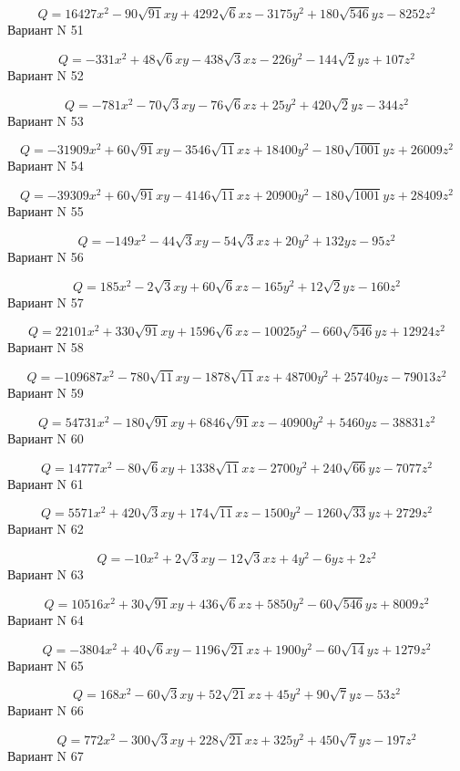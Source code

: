 \documentclass[11pt]{report}
\begin{document}
$$Q = 16427 x^{2} - 90 \sqrt{91} x y + 4292 \sqrt{6} x z - 3175 y^{2} + 180 \sqrt{546} y z - 8252 z^{2}$$Вариант N 51

$$Q = - 331 x^{2} + 48 \sqrt{6} x y - 438 \sqrt{3} x z - 226 y^{2} - 144 \sqrt{2} y z + 107 z^{2}$$Вариант N 52

$$Q = - 781 x^{2} - 70 \sqrt{3} x y - 76 \sqrt{6} x z + 25 y^{2} + 420 \sqrt{2} y z - 344 z^{2}$$Вариант N 53

$$Q = - 31909 x^{2} + 60 \sqrt{91} x y - 3546 \sqrt{11} x z + 18400 y^{2} - 180 \sqrt{1001} y z + 26009 z^{2}$$Вариант N 54

$$Q = - 39309 x^{2} + 60 \sqrt{91} x y - 4146 \sqrt{11} x z + 20900 y^{2} - 180 \sqrt{1001} y z + 28409 z^{2}$$Вариант N 55

$$Q = - 149 x^{2} - 44 \sqrt{3} x y - 54 \sqrt{3} x z + 20 y^{2} + 132 y z - 95 z^{2}$$Вариант N 56

$$Q = 185 x^{2} - 2 \sqrt{3} x y + 60 \sqrt{6} x z - 165 y^{2} + 12 \sqrt{2} y z - 160 z^{2}$$Вариант N 57

$$Q = 22101 x^{2} + 330 \sqrt{91} x y + 1596 \sqrt{6} x z - 10025 y^{2} - 660 \sqrt{546} y z + 12924 z^{2}$$Вариант N 58

$$Q = - 109687 x^{2} - 780 \sqrt{11} x y - 1878 \sqrt{11} x z + 48700 y^{2} + 25740 y z - 79013 z^{2}$$Вариант N 59

$$Q = 54731 x^{2} - 180 \sqrt{91} x y + 6846 \sqrt{91} x z - 40900 y^{2} + 5460 y z - 38831 z^{2}$$Вариант N 60

$$Q = 14777 x^{2} - 80 \sqrt{6} x y + 1338 \sqrt{11} x z - 2700 y^{2} + 240 \sqrt{66} y z - 7077 z^{2}$$Вариант N 61

$$Q = 5571 x^{2} + 420 \sqrt{3} x y + 174 \sqrt{11} x z - 1500 y^{2} - 1260 \sqrt{33} y z + 2729 z^{2}$$Вариант N 62

$$Q = - 10 x^{2} + 2 \sqrt{3} x y - 12 \sqrt{3} x z + 4 y^{2} - 6 y z + 2 z^{2}$$Вариант N 63

$$Q = 10516 x^{2} + 30 \sqrt{91} x y + 436 \sqrt{6} x z + 5850 y^{2} - 60 \sqrt{546} y z + 8009 z^{2}$$Вариант N 64

$$Q = - 3804 x^{2} + 40 \sqrt{6} x y - 1196 \sqrt{21} x z + 1900 y^{2} - 60 \sqrt{14} y z + 1279 z^{2}$$Вариант N 65

$$Q = 168 x^{2} - 60 \sqrt{3} x y + 52 \sqrt{21} x z + 45 y^{2} + 90 \sqrt{7} y z - 53 z^{2}$$Вариант N 66

$$Q = 772 x^{2} - 300 \sqrt{3} x y + 228 \sqrt{21} x z + 325 y^{2} + 450 \sqrt{7} y z - 197 z^{2}$$Вариант N 67
\end{document}
